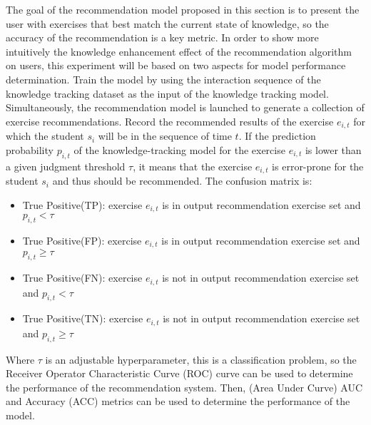 The goal of the recommendation model proposed in this section is to present the user with exercises that best match the current state of knowledge, so the accuracy of the recommendation is a key metric. In order to show more intuitively the knowledge enhancement effect of the recommendation algorithm on users, this experiment will be based on two aspects for model performance determination. Train the model by using the interaction sequence of the knowledge tracking dataset as the input of the knowledge tracking model. Simultaneously, the recommendation model is launched to generate a collection of exercise recommendations. Record the recommended results of the exercise \(e_{i,t}\) for which the student \(s_i\) will be in the sequence of time \(t\). If the prediction probability \(p_{i,t}\) of the knowledge-tracking model for the exercise \(e_{i,t}\) is lower than a given judgment threshold \(\tau \), it means that the exercise \(e_{i,t}\) is error-prone for the student \(s_i\) and thus should be recommended. The confusion matrix is:
\begin{itemize}
  \item True Positive(TP): exercise \(e_{i,t}\) is in output recommendation exercise set and \(p_{i,t}<\tau \)
  \item True Positive(FP): exercise \(e_{i,t}\) is in output recommendation exercise set and \(p_{i,t}\geq \tau \)
  \item True Positive(FN): exercise \(e_{i,t}\) is not in output recommendation exercise set and \(p_{i,t}<\tau \)
  \item True Positive(TN): exercise \(e_{i,t}\) is not in output recommendation exercise set and \(p_{i,t}\geq \tau \)
\end{itemize}
Where \(\tau \) is an adjustable hyperparameter, this is a classification problem, so the Receiver Operator Characteristic Curve (ROC) curve can be used to determine the performance of the recommendation system. Then, (Area Under Curve) AUC and Accuracy (ACC) metrics can be used to determine the performance of the model.


